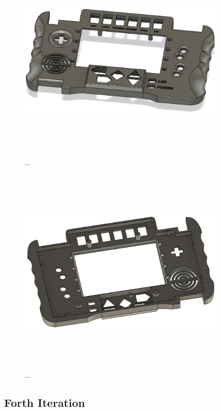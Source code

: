 \begin{figure} [h]
    \centering
    \includegraphics[width=10cm,height=10cm,keepaspectratio]{Figures/iteration3_top_front.png}
    \caption{...}
    \label{fig:iteration3_t_f}
\end{figure}

\begin{figure} [h]
    \centering
    \includegraphics[width=10cm,height=10cm,keepaspectratio]{Figures/iteration3_top_back.png}
    \caption{...}
    \label{fig:iteration3_t_b}
\end{figure}

\subsection{Forth Iteration}

